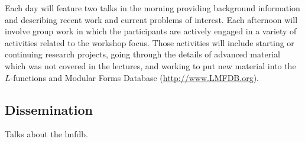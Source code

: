 \documentclass[amstex,11pt]{amsart}
\numberwithin{equation}{section}
\begin{document}
Each day will feature two talks in the morning providing background
information and describing recent work and current problems of
interest.  Each afternoon will involve group work in which the
participants are actively engaged in a variety of activities related
to the workshop focus.  Those activities will include starting or
continuing research projects, going through the details of advanced
material which was not covered in the lectures, and working to put new
material into the $L$-functions and Modular Forms Database
(\url{http://www.LMFDB.org}).

\subsection{Dissemination}

Talks about the lmfdb.


\end{document}
